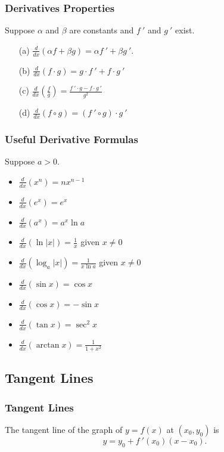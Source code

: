 \documentclass{beamer}
\begin{document}
\begin{frame}
\frametitle{Derivatives Properties}
\begin{Theorem}
Suppose $\alpha$ and $\beta$ are constants and $f\ '$ and $g\ '$ exist. 
\begin{enumerate}
\item[(a)] $\displaystyle\frac{d}{dx}\left(\alpha f + \beta g\right) = \alpha f\ ' + \beta g\ '$.
\item[(b)] $\displaystyle\frac{d}{dx}\left(f\cdot g\right) = g\cdot f\ ' + f\cdot g\ '$
\item[(c)] $\displaystyle\frac{d}{dx}\left(\frac{f}{g}\right) = \frac{f\ '\cdot g - f\cdot g\ '}{g^2}$
\item[(d)] $\displaystyle\frac{d}{dx}\left(f\circ g\right) = \left(f\ ' \circ g\right)\cdot g\ '$
\end{enumerate}
\end{Theorem}
\end{frame}

\begin{frame}
\frametitle{Useful Derivative Formulas}
Suppose $a > 0$.
\begin{multicols}{2}
\begin{itemize}
\item $\frac{d}{dx}(x^n) = n x^{n-1}$				
\item $\frac{d}{dx}(e^x)  = e^x$
\item $\frac{d}{dx}(a^x)  = a^x \ln a$
\item $\frac{d}{dx}\left(\ln|x|\right)  = \frac{1}{x}$ given $x\neq 0$
\item $\frac{d}{dx}\left(\log_a|x|\right) = \frac{1}{x\ln a}$ given $x\neq 0$
\item $\frac{d}{dx}\left(\sin x\right) = \cos x$
\item $\frac{d}{dx}\left(\cos x\right) = -\sin x$
\item $\frac{d}{dx}\left(\tan x\right) = \sec^2 x$
\item $\frac{d}{dx}\left(\arctan x\right) = \frac{1}{1 + x^2}$
\end{itemize}
\end{multicols}
\end{frame}

\subsection{Tangent Lines}

\begin{frame}
\frametitle{Tangent Lines}
The tangent line of the graph of $y = f(x)$ at $(x_0, y_0)$ is
$$
y = y_0 + f\ '(x_0)(x - x_0).
$$
\end{frame}
\end{document}
